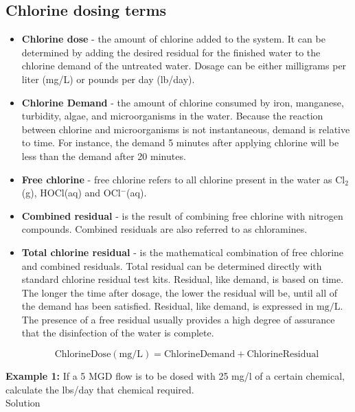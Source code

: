 \subsection*{Chlorine dosing terms}
\begin{itemize}
\item \textbf{Chlorine dose} - the amount of chlorine added to the system. It can be determined by adding the desired residual for the finished water to the chlorine demand of the untreated water. Dosage can be either milligrams per liter (mg/L) or pounds per day (lb/day).

\item \textbf{Chlorine Demand} - the amount of chlorine consumed by iron, manganese, turbidity, algae, and microorganisms in the water. Because the reaction between chlorine and microorganisms is not instantaneous, demand is relative to time. For instance, the demand 5 minutes after applying chlorine will be less than the demand after 20 minutes. 

\item \textbf{Free chlorine} - free chlorine refers to all chlorine present in the water as Cl$_2$(g), HOCl(aq) and OCl$^-$(aq).

\item \textbf{Combined residual} - is the result of combining free chlorine with nitrogen compounds. Combined residuals are also referred to as chloramines. 

\item \textbf{Total chlorine residual} - is the mathematical combination of free chlorine and combined residuals. Total residual can be determined directly with standard chlorine residual test kits.  Residual, like demand, is based on time. The longer the time after dosage, the lower the residual will be, until all of the demand has been satisfied. Residual, like demand, is expressed in $\mathrm{mg} / \mathrm{L}$. The presence of a free residual usually provides a high degree of assurance that the disinfection of the water is complete. 

$$\mathrm{Chlorine Dose} (\mathrm{mg} / \mathrm{L})= \mathrm{Chlorine Demand}+ \mathrm{ Chlorine Residual}$$
\end{itemize}
\textbf{Example 1:} If a 5 MGD flow is to be dosed with 25 mg/l of a certain chemical, calculate the lbs/day that chemical required.\\

Solution\\

